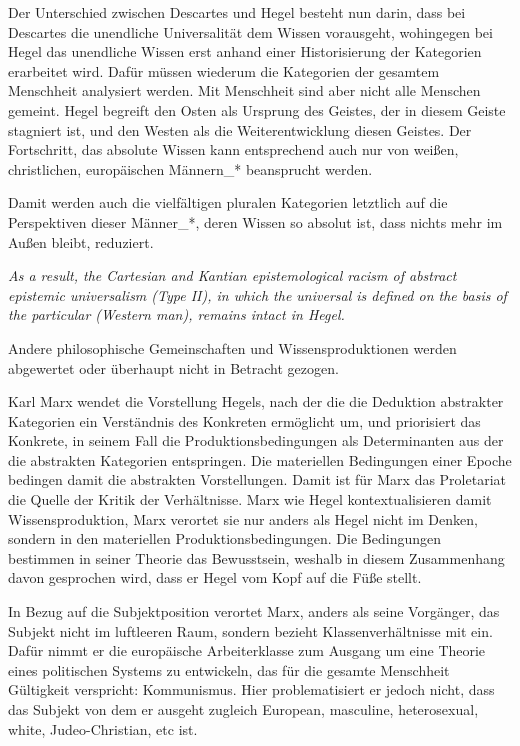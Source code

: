 Der Unterschied zwischen Descartes und Hegel besteht nun darin, dass bei
Descartes die unendliche Universalität dem Wissen vorausgeht, wohingegen bei
Hegel das unendliche Wissen erst anhand einer Historisierung der Kategorien
erarbeitet wird. Dafür müssen wiederum die Kategorien der gesamtem Menschheit
analysiert werden.  Mit Menschheit sind aber nicht alle Menschen gemeint. Hegel
begreift den Osten als Ursprung des Geistes, der in diesem Geiste stagniert
ist, und den Westen als die Weiterentwicklung diesen Geistes. Der Fortschritt,
das absolute Wissen kann entsprechend auch nur von weißen, christlichen,
europäischen Männern\_* beansprucht werden.

Damit werden auch die vielfältigen pluralen Kategorien letztlich auf die
Perspektiven dieser Männer\_*, deren Wissen so absolut ist, dass nichts mehr im
Außen bleibt, reduziert.
  
\begin{myenv} 
  \textit{\glqq As a result, the Cartesian and Kantian
  epistemological racism of abstract epistemic universalism (Type II), in which
the universal is defined on the basis of the particular (Western man), remains
intact in Hegel.\grqq \footnotemark {} }
\end{myenv}

Andere philosophische Gemeinschaften und Wissensproduktionen werden abgewertet oder überhaupt nicht in Betracht gezogen.

Karl Marx wendet die Vorstellung Hegels, nach der die die Deduktion abstrakter
Kategorien ein Verständnis des Konkreten ermöglicht um, und priorisiert das
Konkrete, in seinem Fall die Produktionsbedingungen als Determinanten aus der
die abstrakten Kategorien entspringen.\footnotemark {} Die materiellen Bedingungen einer
Epoche bedingen damit die abstrakten Vorstellungen. Damit ist für Marx das
Proletariat die Quelle der Kritik der Verhältnisse. Marx wie Hegel
kontextualisieren damit Wissensproduktion, Marx verortet sie nur anders als
Hegel nicht im Denken, sondern in den materiellen Produktionsbedingungen. Die
Bedingungen bestimmen in seiner Theorie das Bewusstsein, weshalb in diesem
Zusammenhang davon gesprochen wird, dass er Hegel vom Kopf auf die Füße stellt.

In Bezug auf die Subjektposition verortet Marx, anders als seine Vorgänger, das
Subjekt nicht im luftleeren Raum, sondern bezieht Klassenverhältnisse mit ein.
Dafür nimmt er die europäische Arbeiterklasse zum Ausgang um eine Theorie eines
politischen Systems zu entwickeln, das für die gesamte Menschheit Gültigkeit
verspricht: Kommunismus. Hier problematisiert er jedoch nicht, dass das Subjekt
von dem er ausgeht zugleich  \glqq European, masculine, heterosexual, white,
Judeo-Christian, etc \grqq \footnotemark {} ist.

